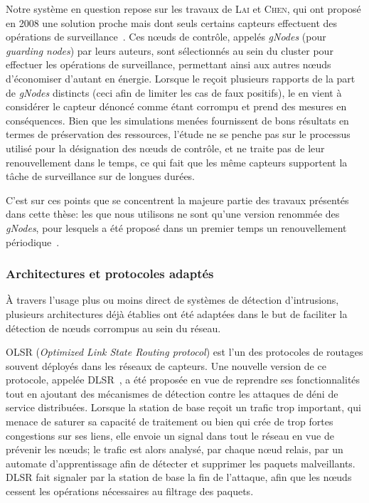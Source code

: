 Notre système en question repose sur les travaux de \textsc{Lai} et \textsc{Chen}, qui ont proposé en 2008 une solution proche mais dont seuls certains capteurs effectuent des opérations de surveillance~\cite{LC08}.
Ces nœuds de contrôle, appelés \textit{gNodes} (pour \textit{guarding nodes}) par leurs auteurs, sont sélectionnés au sein du cluster pour effectuer les opérations de surveillance, permettant ainsi aux autres nœuds d'économiser d'autant en énergie.
Lorsque le \ch reçoit plusieurs rapports de la part de \textit{gNodes} distincts (ceci afin de limiter les cas de faux positifs), le \CH en vient à considérer le capteur dénoncé comme étant corrompu et prend des mesures en conséquences.
Bien que les simulations menées fournissent de bons résultats en termes de préservation des ressources, l'étude ne se penche pas sur le processus utilisé pour la désignation des nœuds de contrôle, et ne traite pas de leur renouvellement dans le temps, ce qui fait que les même capteurs supportent la tâche de surveillance sur de longues durées.

C'est sur ces points que se concentrent la majeure partie des travaux présentés dans cette thèse: les \cns que nous utilisons ne sont qu'une version renommée des \textit{gNodes}, pour lesquels a été proposé dans un premier temps un renouvellement périodique~\cite{GMT12}.

\subsubsection{Architectures et protocoles adaptés}
À travers l'usage plus ou moins direct de systèmes de détection d'intrusions, plusieurs architectures déjà établies ont été adaptées dans le but de faciliter la détection de nœuds corrompus au sein du réseau.

OLSR (\textit{Optimized Link State Routing protocol}) est l'un des protocoles de routages souvent déployés dans les réseaux de capteurs.
Une nouvelle version de ce protocole, appelée DLSR~\cite{MKASF10}, a été proposée en vue de reprendre ses fonctionnalités tout en ajoutant des mécanismes de détection contre les attaques de déni de service distribuées.
Lorsque la station de base reçoit un trafic trop important, qui menace de saturer sa capacité de traitement ou bien qui crée de trop fortes congestions sur ses liens, elle envoie un signal dans tout le réseau en vue de prévenir les nœuds; le trafic est alors analysé, par chaque nœud relais, par un automate d'apprentissage afin de détecter et supprimer les paquets malveillants.
DLSR fait signaler par la station de base la fin de l'attaque, afin que les nœuds cessent les opérations nécessaires au filtrage des paquets.


